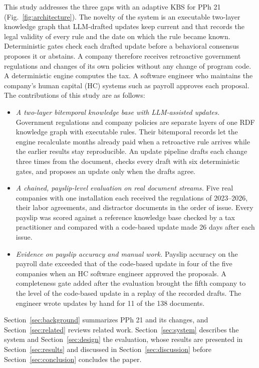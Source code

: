 This study addresses the three gaps with an adaptive KBS for PPh 21 (Fig.~\ref{fig:architecture}). The novelty of the system is an executable two-layer knowledge graph that LLM-drafted updates keep current and that records the legal validity of every rule and the date on which the rule became known. Deterministic gates check each drafted update before a behavioral consensus proposes it or abstains. A company therefore receives retroactive government regulations and changes of its own policies without any change of program code. A deterministic engine computes the tax. A software engineer who maintains the company's human capital (HC) systems such as payroll approves each proposal. The contributions of this study are as follows:
\begin{itemize}
  \item \emph{A two-layer bitemporal knowledge base with LLM-assisted updates.} Government regulations and company policies are separate layers of one RDF knowledge graph with executable rules. Their bitemporal records let the engine recalculate months already paid when a retroactive rule arrives while the earlier results stay reproducible. An update pipeline drafts each change three times from the document, checks every draft with six deterministic gates, and proposes an update only when the drafts agree.
  \item \emph{A chained, payslip-level evaluation on real document streams.} Five real companies with one installation each received the regulations of 2023--2026, their labor agreements, and distractor documents in the order of issue. Every payslip was scored against a reference knowledge base checked by a tax practitioner and compared with a code-based update made 26 days after each issue.
  \item \emph{Evidence on payslip accuracy and manual work.} Payslip accuracy on the payroll date exceeded that of the code-based update in four of the five companies when an HC software engineer approved the proposals. A completeness gate added after the evaluation brought the fifth company to the level of the code-based update in a replay of the recorded drafts. The engineer wrote updates by hand for 11 of the 138 documents.
\end{itemize}

Section~\ref{sec:background} summarizes PPh 21 and its changes, and Section~\ref{sec:related} reviews related work. Section~\ref{sec:system} describes the system and Section~\ref{sec:design} the evaluation, whose results are presented in Section~\ref{sec:results} and discussed in Section~\ref{sec:discussion} before Section~\ref{sec:conclusion} concludes the paper.
